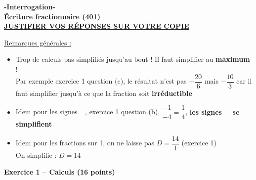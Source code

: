 \documentclass[12pt,a4paper]{exam}
\begin{document}
\begin{center}
\Large \textbf{-Interrogation-\\Écriture fractionnaire (401)}
\vspace{0.5cm}
\\\large \underline{\textbf{JUSTIFIER VOS RÉPONSES SUR VOTRE COPIE}}
\end{center}
\noindent\hrulefill
\vspace{0.5cm}

{\color{red}

\underline{Remarques générales :}

\vspace{5pt}
\begin{itemize}
    \item Trop de calculs pas simplifiés jusqu'au bout ! Il faut simplifier 
    au \textbf{maximum} !
    \\Par exemple exercice 1 question (c), le résultat n'est pas $-\dfrac{20}{6}$ mais 
    $-\dfrac{10}{3}$ car il faut simplifier jusqu'à ce que la fraction soit \textbf{irréductible}
    \item Idem pour les signes $-$, exercice 1 question (b), $\dfrac{-1}{-4} = \dfrac{1}{4}$, 
    \textbf{les signes $-$ se simplifient}
    \item Idem pour les fractions sur 1, on ne laisse pas $D = \dfrac{14}{1}$ (exercice 1)
    \\On simplifie : $D = 14$
\end{itemize}
}

\vspace{0.5cm}


\textbf{Exercice 1 – Calculs (16 points)}
\vspace{5pt}
\end{document}
